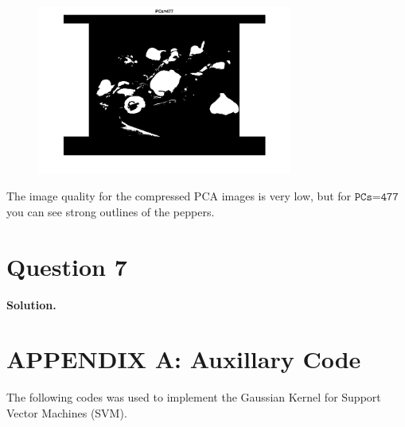 \documentclass[11pt]{article}
\begin{document}
\begin{figure}[!h]
  \centering
  \includegraphics[width=0.75\textwidth]{../q6/compressed_477.png}
  \label{fig:comp477}
\end{figure}

The image quality for the compressed PCA images is very low, but for \(\texttt{PCs=477}\) you can see strong outlines of the peppers.


\clearpage
\section*{Question 7}

\textbf{Solution.}




\clearpage
\section*{APPENDIX A: Auxillary Code}

The following codes was used to implement the Gaussian Kernel for Support Vector Machines (SVM).





\end{document}

